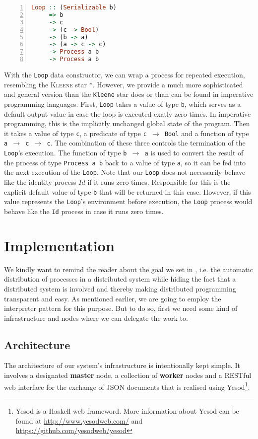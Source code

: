 \begin{lstlisting}[language=Haskell,caption=Signature of the \texttt{Loop} type constructor.,numbers=left,frame=bt]
Loop :: (Serializable b)
     => b
     -> c
     -> (c -> Bool)
     -> (b -> a)
     -> (a -> c -> c)
     -> Process a b
     -> Process a b
\end{lstlisting}
With the \texttt{Loop} data constructor, we can wrap a process for repeated execution, resembling the \textsc{Kleene} star $*$. However, we provide a much more sophisticated and general version than the \texttt{Kleene} star does or than can be found in imperative programming languages. First, \texttt{Loop} takes a value of type \texttt{b}, which serves as a default output value in case the loop is executed exatly zero times. In imperative programming, this is the implicitly unchanged global state of the program. Then it takes a value of type \texttt{c}, a predicate of type \texttt{c $\to$ Bool} and a function of type \texttt{a $\to$ c $\to$ c}. The combination of these three controls the termination of the \texttt{Loop}'s execution. The function of type \texttt{b $\to$ a} is used to convert the result of the process of type \texttt{Process a b} back to a value of type \texttt{a}, so it can be fed into the next execution of the \texttt{Loop}. Note that our \texttt{Loop} does not necessarily behave like the identity process $Id$ if it runs zero times. Responsible for this is the explicit default value of type \texttt{b} that will be returned in this case. However, if this value represents the \texttt{Loop}'s environment before execution, the \texttt{Loop} process would behave like the \texttt{Id} process in case it runs zero times. 

\section{Implementation}
\label{chp:implementation}
We kindly want to remind the reader about the goal we set in , i.e. the automatic distribution of processes in a distributed system while hiding the fact that a distributed system is involved and thereby making distributed programming transparent and easy. As mentioned earlier, we are going to employ the interpreter pattern \cite{Gamma:1995:DPE:186897} for this purpose. But to do so, first we need some kind of infrastructure and nodes where we can delegate the work to.

\subsection{Architecture}
The architecture of our system's infrastructure is intentionally kept simple. It involves a designated \textbf{master} node, a collection of \textbf{worker} nodes and a RESTful web interface for the exchange of JSON documents that is realised using Yesod\footnote{Yesod is a Haskell web frameword. More information about Yesod can be found at \url{http://www.yesodweb.com/} and \url{https://github.com/yesodweb/yesod}}.


